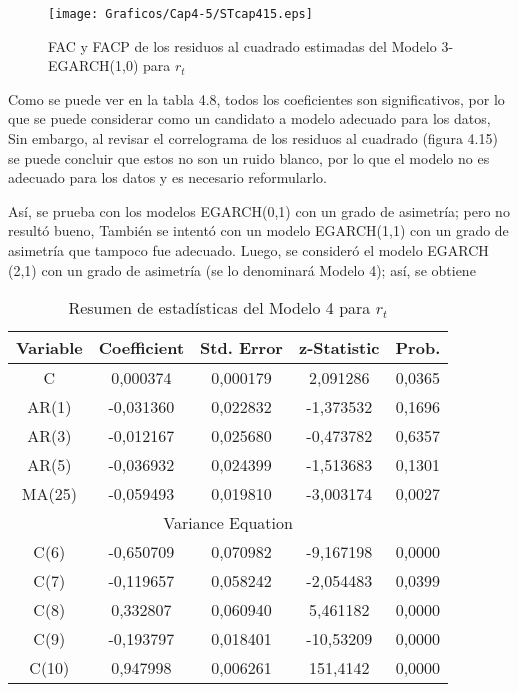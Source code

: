 \begin{figure}[H]
\centering
\texttt{[image: Graficos/Cap4-5/STcap415.eps]}
\caption{FAC y FACP de los residuos al cuadrado estimadas del Modelo 3-EGARCH(1,0) para $r_{t}$}
\end{figure}

Como se puede ver en la tabla 4.8, todos los coeficientes son significativos, por lo que se puede considerar como un candidato a modelo adecuado para los datos, Sin embargo, al revisar el correlograma de los residuos al cuadrado (figura 4.15) se puede concluir que estos no son un ruido blanco, por lo que el modelo no es adecuado para los datos y es necesario reformularlo.\newline

As\'{i}, se prueba con los modelos EGARCH(0,1) con un grado de asimetr\'{i}a; pero no result\'{o} bueno, Tambi\'{e}n se intent\'{o} con un modelo EGARCH(1,1) con un grado de asimetr\'{i}a que tampoco fue adecuado. Luego, se consider\'{o} el modelo EGARCH (2,1) con un grado de asimetr\'{i}a (se lo denominar\'{a} Modelo 4); as\'{i}, se obtiene

\begin{table}[H]
\centering
\begin{tabular}{ccccc}\hline\hline
Variable & Coefficient & Std. Error & z-Statistic & Prob.\\ \hline\hline
C & 0,000374 & 0,000179 & 2,091286 & 0,0365 \\
AR(1) & -0,031360 & 0,022832 & -1,373532 & 0,1696 \\
AR(3) & -0,012167 & 0,025680 & -0,473782 & 0,6357 \\
AR(5) & -0,036932 & 0,024399 & -1,513683 & 0,1301 \\
MA(25) & -0,059493 & 0,019810 & -3,003174 & 0,0027 \\ \hline\hline
\multicolumn{5}{c}{Variance Equation}\\ \hline\hline
C(6) & -0,650709 & 0,070982 & -9,167198 & 0,0000 \\
C(7) & -0,119657 & 0,058242 & -2,054483 & 0,0399 \\
C(8) & 0,332807 & 0,060940 & 5,461182 & 0,0000 \\
C(9) & -0,193797 & 0,018401 & -10,53209 & 0,0000 \\
C(10) & 0,947998 & 0,006261 & 151,4142 & 0,0000 \\ \hline\hline
\end{tabular}
\caption{Resumen de estad\'{i}sticas del Modelo 4 para $r_{t}$}
\end{table}

